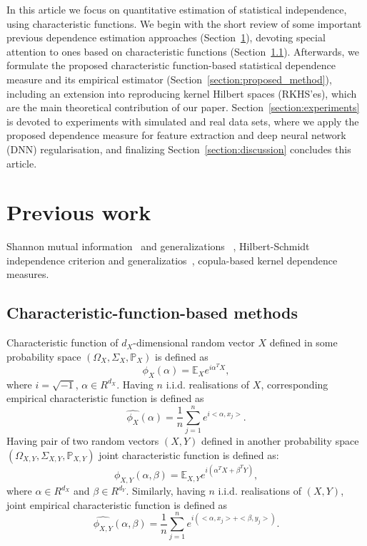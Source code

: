 \documentclass{article}
\begin{document}
In this article we focus on quantitative estimation of statistical independence, using characteristic functions. We begin with the short review of some important previous dependence estimation approaches (Section~\ref{section:previous_work}), devoting special attention to ones based on characteristic functions (Section~\ref{section:previous_work_cf}). Afterwards, we formulate the proposed characteristic function-based statistical dependence measure and its empirical estimator (Section~\ref{section:proposed_method}), including an extension into reproducing kernel Hilbert spaces (RKHS'es), which are the main theoretical contribution of our paper. Section~\ref{section:experiments} is devoted to experiments with simulated and real data sets, where we apply the proposed dependence measure for feature extraction and deep neural network (DNN) regularisation,  and finalizing Section~\ref{section:discussion} concludes this article.

\section{Previous work}
\label{section:previous_work}
Shannon mutual information~\cite{Cover2006} and generalizations ~\cite{e20110813},  Hilbert-Schmidt independence criterion \cite{Gretton2005MeasuringSD} and generalizatios~\cite{?}, \cite{Pczos2012CopulabasedKD} copula-based kernel dependence measures.

\subsection{Characteristic-function-based methods}
\label{section:previous_work_cf}
Characteristic function of $d_{X}$-dimensional random vector $X$ defined in some probability space $(\Omega_{X}, \Sigma_{X}, \mathbb{P}_{X})$ is defined as 
\begin{equation}
    \label{eq:characteristic_function}
    \phi_{X}(\alpha) = \mathbb{E}_{X} e^{i\alpha^{T}X}, 
\end{equation}
where $i=\sqrt{-1}$, $\alpha \in R^{d_{X}}$. Having $n$ i.i.d. realisations of $X$, corresponding empirical characteristic function is defined as
\begin{equation}
    \label{eq:ecf}
  \widehat{\phi_{X}}(\alpha) = \frac{1}{n} \sum_{j=1}^{n} e^{i <\alpha, x_{j}>}.
\end{equation}
Having pair of two random vectors $(X,Y)$ defined in another probability space $(\Omega_{X,Y}, \Sigma_{X,Y}, \mathbb{P}_{X,Y})$  joint characteristic function is defined as:
\begin{equation}
    \label{eq:joint_characteristic_function}
    \phi_{X,Y}(\alpha,\beta) = \mathbb{E}_{X,Y} e^{i(\alpha^{T}X + \beta^{T}Y)},
\end{equation}
where $\alpha \in R^{d_{X}}$ and $\beta \in R^{d_{Y}}$. Similarly, having 
$n$ i.i.d. realisations of $(X,Y)$, joint empirical characteristic function is defined as
\begin{equation}
    \label{eq:joint_ecf}
\widehat{\phi_{X,Y}}(\alpha,\beta) = \frac{1}{n} \sum_{j=1}^{n} e^{i(<\alpha, x_{j}> + <\beta, y_{j}>) }.
\end{equation}
\end{document}
